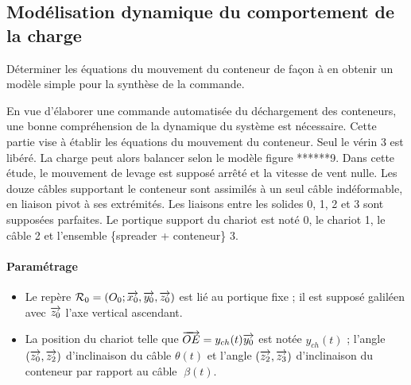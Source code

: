 \documentclass[10pt,fleqn]{article} %
\begin{document}
\def\pathfig{images}

\vspace{5cm}
\pagestyle{fancy}
\thispagestyle{plain}

\def\columnseprulecolor{\color{ocre}}
\setlength{\columnseprule}{0.4pt} 

\def\pathfig{images}

\ifprof
\else
\begin{multicols}{2}
\fi

\subsection*{Modélisation dynamique du comportement de la charge}

\begin{obj}
Déterminer les équations du mouvement du conteneur de façon à en obtenir un modèle simple pour
la synthèse de la commande.
\end{obj}
En vue d’élaborer une commande automatisée du déchargement des conteneurs, une bonne compréhension de
la dynamique du système est nécessaire. Cette partie vise à établir les équations du mouvement du conteneur.
Seul le vérin 3 est libéré. La charge peut alors balancer selon le modèle figure ******9. Dans cette étude, le mouvement
de levage est supposé arrêté et la vitesse de vent nulle. Les douze câbles supportant le conteneur sont assimilés
à un seul câble indéformable, en liaison pivot à ses extrémités. Les liaisons entre les solides 0, 1, 2 et 3 sont
supposées parfaites.
Le portique support du chariot est noté 0, le chariot 1, le câble 2 et l’ensemble \{spreader + conteneur\} 3.

\paragraph*{Paramétrage}
\begin{itemize}
\item Le repère $\mathcal{R}_0=\left(O_0;\overrightarrow{x_0},\overrightarrow{y_0},\overrightarrow{z_0} \right)$ est lié au portique fixe ; il est supposé
galiléen avec $\overrightarrow{z_0}$ l’axe vertical ascendant.
\item La position du chariot telle que $\overrightarrow{OE} = y_{ch}(t) \overrightarrow{y_0}$ est notée $y_{ch}(t)$ ;
l’angle $\left(\overrightarrow{z_0},\overrightarrow{z_2}\right)$ d’inclinaison du câble $\theta(t)$ et l’angle $\left(\overrightarrow{z_2},\overrightarrow{z_3}\right)$ d’inclinaison
du conteneur par rapport au câble $\beta(t)$.
\end{itemize}



\end{multicols}
\end{document}
